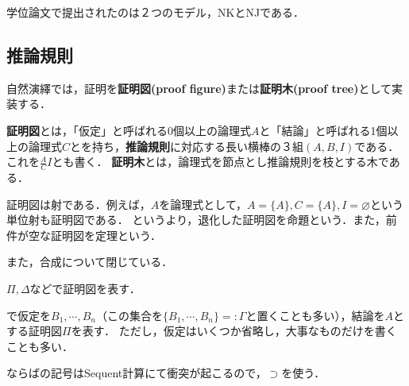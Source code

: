 \documentclass[uplatex, 12pt, dvipdfmx]{jsreport}
\begin{document}
学位論文で提出されたのは２つのモデル，NKとNJである．

\subsection{推論規則}
自然演繹では，証明を\textbf{証明図(proof figure)}または\textbf{証明木(proof tree)}として実装する．

\begin{definition}
    \textbf{証明図}とは，「仮定」と呼ばれる0個以上の論理式$A$と「結論」と呼ばれる1個以上の論理式$C$とを持ち，\textbf{推論規則}に対応する長い横棒の３組$(A,B,I)$である．
    これを$\frac{A}{C}I$とも書く．
    \textbf{証明木}とは，論理式を節点とし推論規則を枝とする木である．
\end{definition}
\begin{remark}
    証明図は射である．例えば，$A$を論理式として，$A=\{A\},C=\{A\},I=\varnothing$という単位射も証明図である．
    というより，退化した証明図を命題という．また，前件が空な証明図を定理という．

    また，合成について閉じている．
\end{remark}

\begin{notation}[証明図]
    $\Pi,\Delta$などで証明図を表す．
    \begin{center}
    \end{center}
    で仮定を$B_1,\cdots,B_n$（この集合を$\{B_1,\cdots,B_n\}=:\Gamma$と置くことも多い），結論を$A$とする証明図$\Pi$を表す．
    ただし，仮定はいくつか省略し，大事なものだけを書くことも多い．
\end{notation}
\begin{notation}[ならば]
    ならばの記号はSequent計算にて衝突が起こるので，$\supset$を使う．
\end{notation}
\end{document}
